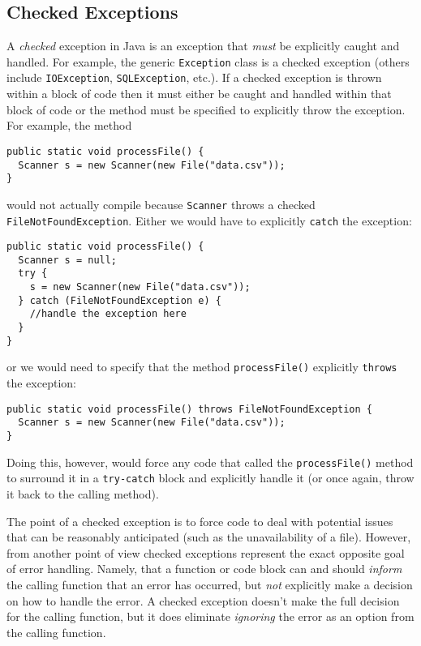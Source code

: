 \subsection{Checked Exceptions}
\label{section:java:checkedExceptions}

A \emph{checked} exception in Java is an exception that \emph{must}
be explicitly caught and handled.  For example, the generic 
\texttt{Exception} class is a checked exception (others 
include \texttt{IOException}, \texttt{SQLException}, 
etc.).  If a checked exception is thrown within a block of code 
then it must either be caught and handled within that
block of code or the method must be specified to explicitly 
throw the exception.  For example, the method

\begin{verbatim}
public static void processFile() {
  Scanner s = new Scanner(new File("data.csv"));
}
\end{verbatim}

would not actually compile because \texttt{Scanner}
throws a checked \texttt{FileNotFoundException}.  Either
we would have to explicitly \texttt{catch} the exception:

\begin{verbatim}
public static void processFile() {
  Scanner s = null;
  try {
    s = new Scanner(new File("data.csv"));
  } catch (FileNotFoundException e) {
    //handle the exception here
  }
}
\end{verbatim}

or we would need to specify that the method \texttt{processFile()}
explicitly \texttt{throws} the exception:

\begin{verbatim}
public static void processFile() throws FileNotFoundException {
  Scanner s = new Scanner(new File("data.csv"));
}
\end{verbatim}

Doing this, however, would force any code that called the 
\texttt{processFile()} method to surround it in a 
\texttt{try-catch} block and explicitly handle it (or
once again, throw it back to the calling method).  

The point of a checked exception is to force code to deal with
potential issues that can be reasonably anticipated (such as
the unavailability of a file).  However, from another point of 
view checked exceptions represent the exact opposite goal
of error handling.  Namely, that a function or code block can
and should \emph{inform} the calling function that an error
has occurred, but \emph{not} explicitly make a decision on
how to handle the error.  A checked exception doesn't make
the full decision for the calling function, but it does eliminate 
\emph{ignoring} the error as an option from the calling function.

